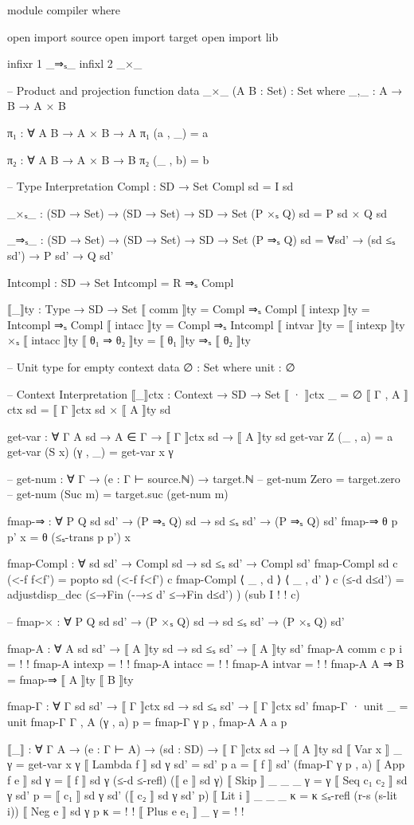 \documentclass{article}
\begin{document}
\begin{code}
module compiler where

open import source
open import target
open import lib


infixr 1 _⇒ₛ_ 
infixl 2 _×_

-- Product and projection function
data _×_ (A B : Set) : Set where
    _,_ : A → B → A × B

π₁ : ∀ {A B} → A × B → A
π₁ (a , _) = a

π₂ : ∀ {A B} → A × B → B
π₂ (_ , b) = b

--  Type Interpretation
Compl : SD → Set
Compl sd = I sd

_×ₛ_ : (SD → Set) → (SD → Set) → SD → Set
(P ×ₛ Q) sd = P sd × Q sd

_⇒ₛ_ : (SD → Set) → (SD → Set) → SD → Set
(P ⇒ₛ Q) sd = ∀{sd'} → (sd ≤ₛ sd') → P sd' → Q sd' 

Intcompl : SD → Set
Intcompl = R ⇒ₛ Compl


⟦_⟧ty : Type → SD → Set
⟦ comm ⟧ty = Compl ⇒ₛ Compl
⟦ intexp ⟧ty = Intcompl ⇒ₛ Compl
⟦ intacc ⟧ty = Compl ⇒ₛ Intcompl
⟦ intvar ⟧ty = ⟦ intexp ⟧ty ×ₛ ⟦ intacc ⟧ty
⟦ θ₁ ⇒ θ₂ ⟧ty = ⟦ θ₁ ⟧ty ⇒ₛ ⟦ θ₂ ⟧ty

-- Unit type for empty context
data ∅ : Set where
    unit : ∅

-- Context Interpretation
⟦_⟧ctx : Context → SD → Set
⟦ · ⟧ctx _ = ∅
⟦ Γ , A ⟧ctx sd = ⟦ Γ ⟧ctx sd × ⟦ A ⟧ty sd

get-var : ∀ {Γ A sd} → A ∈ Γ → ⟦ Γ ⟧ctx sd → ⟦ A ⟧ty sd
get-var Z     (_ , a) = a
get-var (S x) (γ , _) = get-var x γ


-- get-num : ∀ {Γ} → (e : Γ ⊢ source.ℕ) → target.ℕ
-- get-num Zero = target.zero
-- get-num (Suc m) = target.suc (get-num m)

fmap-⇒ : ∀ {P Q sd sd'} → (P ⇒ₛ Q) sd → sd ≤ₛ sd' → (P ⇒ₛ Q) sd'
fmap-⇒ θ p p' x = θ (≤ₛ-trans p p') x

fmap-Compl : ∀ {sd sd'} → Compl sd → sd ≤ₛ sd' → Compl sd'
fmap-Compl {sd} c (<-f f<f') = popto sd (<-f f<f') c
fmap-Compl {⟨ _ , d ⟩} {⟨ _ , d' ⟩} c (≤-d d≤d') = adjustdisp_dec (≤→Fin (-→≤ {d'} {≤→Fin d≤d'}) ) (sub I {!   !} c)

-- fmap-× : ∀ {P Q sd sd'} → (P ×ₛ Q) sd → sd ≤ₛ sd' → (P ×ₛ Q) sd'

fmap-A : ∀ {A sd sd'} → ⟦ A ⟧ty sd → sd ≤ₛ sd' → ⟦ A ⟧ty sd'
fmap-A {comm} c p i = {!   !}
fmap-A {intexp} = {!   !}
fmap-A {intacc} = {!   !}
fmap-A {intvar} = {!   !}
fmap-A {A ⇒ B} = fmap-⇒ {⟦ A ⟧ty} {⟦ B ⟧ty}

fmap-Γ : ∀ {Γ sd sd'} → ⟦ Γ ⟧ctx sd → sd ≤ₛ sd' → ⟦ Γ ⟧ctx sd'
fmap-Γ {·} unit _ = unit
fmap-Γ {Γ , A} (γ , a) p = fmap-Γ γ p , fmap-A {A} a p


⟦_⟧ : ∀ {Γ A} → (e : Γ ⊢ A) → (sd : SD) → ⟦ Γ ⟧ctx sd → ⟦ A ⟧ty sd
⟦ Var x ⟧ _ γ = get-var x γ
⟦ Lambda f ⟧ sd γ {sd' = sd'} p a = ⟦ f ⟧ sd' (fmap-Γ γ p , a) 
⟦ App f e ⟧ sd γ = ⟦ f ⟧ sd γ (≤-d ≤-refl) (⟦ e ⟧ sd γ)
⟦ Skip ⟧ _ _ _ γ = γ
⟦ Seq c₁ c₂ ⟧ sd γ sd' p = ⟦ c₁ ⟧ sd γ sd' (⟦ c₂ ⟧ sd γ sd' p)
⟦ Lit i ⟧ _ _ _ κ = κ ≤ₛ-refl (r-s (s-lit i))
⟦ Neg e ⟧ sd γ p κ = {!   !} 
⟦ Plus e e₁ ⟧ _ γ = {!   !} 
\end{code}
\end{document}

